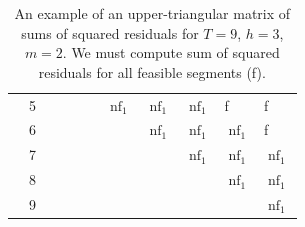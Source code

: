 \documentclass[presentation.tex]{subfiles}
\begin{document}
\begin{frame}[fragile]
\begin{table}[]
\begin{tabular}{lllllllllll}
\multicolumn{1}{l|}{}              & \multicolumn{1}{l|}{5} & \multicolumn{1}{l|}{}     & \multicolumn{1}{l|}{}     & \multicolumn{1}{l|}{}     & \multicolumn{1}{l|}{}     & \multicolumn{1}{l|}{$\operatorname{nf}_1$} & \multicolumn{1}{l|}{$\operatorname{nf}_1$} & \multicolumn{1}{l|}{$\operatorname{nf}_1$} & \multicolumn{1}{l|}{f}   & \multicolumn{1}{l|}{f}   \\ \cline{2-11} 
\multicolumn{1}{l|}{}              & \multicolumn{1}{l|}{6} & \multicolumn{1}{l|}{}     & \multicolumn{1}{l|}{}     & \multicolumn{1}{l|}{}     & \multicolumn{1}{l|}{}     & \multicolumn{1}{l|}{}     & \multicolumn{1}{l|}{$\operatorname{nf}_1$} & \multicolumn{1}{l|}{$\operatorname{nf}_1$} & \multicolumn{1}{l|}{$\operatorname{nf}_1$} & \multicolumn{1}{l|}{f}   \\ \cline{2-11} 
\multicolumn{1}{l|}{}              & \multicolumn{1}{l|}{7} & \multicolumn{1}{l|}{}     & \multicolumn{1}{l|}{}     & \multicolumn{1}{l|}{}     & \multicolumn{1}{l|}{}     & \multicolumn{1}{l|}{}     & \multicolumn{1}{l|}{}     & \multicolumn{1}{l|}{$\operatorname{nf}_1$} & \multicolumn{1}{l|}{$\operatorname{nf}_1$} & \multicolumn{1}{l|}{$\operatorname{nf}_1$} \\ \cline{2-11} 
\multicolumn{1}{l|}{}              & \multicolumn{1}{l|}{8} & \multicolumn{1}{l|}{}     & \multicolumn{1}{l|}{}     & \multicolumn{1}{l|}{}     & \multicolumn{1}{l|}{}     & \multicolumn{1}{l|}{}     & \multicolumn{1}{l|}{}     & \multicolumn{1}{l|}{}     & \multicolumn{1}{l|}{$\operatorname{nf}_1$} & \multicolumn{1}{l|}{$\operatorname{nf}_1$} \\ \cline{2-11} 
\multicolumn{1}{l|}{}              & \multicolumn{1}{l|}{9} & \multicolumn{1}{l|}{}     & \multicolumn{1}{l|}{}     & \multicolumn{1}{l|}{}     & \multicolumn{1}{l|}{}     & \multicolumn{1}{l|}{}     & \multicolumn{1}{l|}{}     & \multicolumn{1}{l|}{}     & \multicolumn{1}{l|}{}     & \multicolumn{1}{l|}{$\operatorname{nf}_1$} \\ \cline{2-11} 
\end{tabular}
\caption{An example of an upper-triangular matrix of sums of squared residuals for $T =
  9$, $h=3$, $m=2$. We must compute sum of squared residuals for all feasible
  segments (f).
}
\end{table}
\end{frame}
\end{document}
